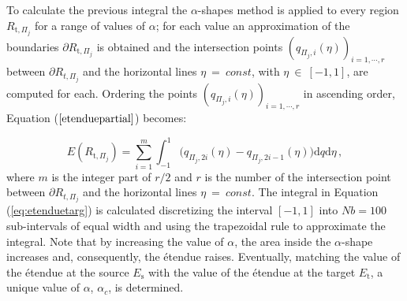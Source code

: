 To calculate the previous integral the $\alpha$-shapes method is applied to every region
  $R_{\textrm{t},\Pi_j}$ for a range of values of $\alpha$;
   for each value an approximation of the boundaries $\partial R_{\textrm{t},\Pi_j}$ is obtained and
   the intersection points $(q_{\Pi_j,i}( \eta))_{i = 1, \cdots, r}$ between $\partial R_{t,\Pi_j}$
and the horizontal lines $\eta ~=~ const$, with $\eta~\in~[-1,1]$, are computed for each.
Ordering the points $(q_{\Pi_j,i}( \eta))_{i = 1, \cdots, r}$ in ascending order,
 Equation ($\ref{etenduepartial}$) becomes:

\begin{equation}\label{eq:etenduetarg}
 E(R_{\textrm{t}, \Pi_j}) =\sum_{i = 1}^{m} \int_{-1}^{1}{(q_{\Pi_j, 2i}( \eta)}-{q_{\Pi_j,2i-1} ( \eta) )} \textrm{d}q\textrm{d}\eta \,,
\end{equation}
where $m$ is the integer part of $r/2$ and $r$ is the number of the intersection point between $\partial R_{t,\Pi_j}$
and the horizontal lines $\eta ~=~ const$. The integral in Equation (\ref{eq:etenduetarg}) is calculated discretizing the interval $[-1, 1]$
   into $Nb=100$ sub-intervals of equal width and using the trapezoidal rule to approximate the integral.
   Note that by increasing the value of $\alpha$, the area inside the $\alpha$-shape increases and, consequently, the \'{e}tendue raises.
\noindent Eventually, matching the value of the \'{e}tendue at the source $E_{\textrm{s}}$ with the value of the \'{e}tendue at the target $E_{\textrm{t}}$, a unique value of $\alpha$, $\alpha_{c}$, is determined.

